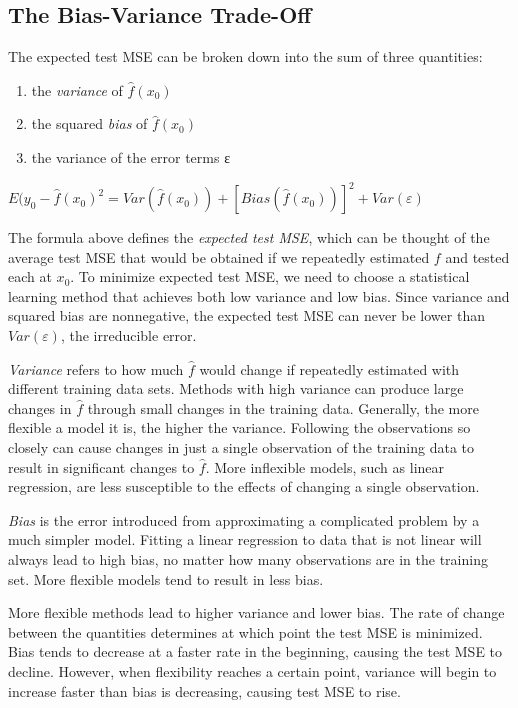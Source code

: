 \documentclass[]{book}
\providecommand{\tightlist}{%
  \setlength{\itemsep}{0pt}\setlength{\parskip}{0pt}}
\begin{document}
\hypertarget{the-bias-variance-trade-off}{%
\subsection{The Bias-Variance Trade-Off}\label{the-bias-variance-trade-off}}

The expected test MSE can be broken down into the sum of three quantities:

\begin{enumerate}
\def\labelenumi{\arabic{enumi}.}
\tightlist
\item
  the \emph{variance} of \(\hat{f}(x_0)\)
\item
  the squared \emph{bias} of \(\hat{f}(x_0)\)
\item
  the variance of the error terms ε
\end{enumerate}

\(E(y_0 - \hat{f}(x_0)^2 = Var(\hat{f}(x_0)) + [Bias(\hat{f}(x_0))]^2+Var(ε)\)

The formula above defines the \emph{expected test MSE}, which can be thought of the average test MSE that would be obtained if we repeatedly estimated \(f\) and tested each at \(x_0\). To minimize expected test MSE, we need to choose a statistical learning method that achieves both low variance and low bias. Since variance and squared bias are nonnegative, the expected test MSE can never be lower than \(Var(ε)\), the irreducible error.

\emph{Variance} refers to how much \(\hat{f}\) would change if repeatedly estimated with different training data sets. Methods with high variance can produce large changes in \(\hat{f}\) through small changes in the training data. Generally, the more flexible a model it is, the higher the variance. Following the observations so closely can cause changes in just a single observation of the training data to result in significant changes to \(\hat{f}\). More inflexible models, such as linear regression, are less susceptible to the effects of changing a single observation.

\emph{Bias} is the error introduced from approximating a complicated problem by a much simpler model. Fitting a linear regression to data that is not linear will always lead to high bias, no matter how many observations are in the training set. More flexible models tend to result in less bias.

More flexible methods lead to higher variance and lower bias. The rate of change between the quantities determines at which point the test MSE is minimized. Bias tends to decrease at a faster rate in the beginning, causing the test MSE to decline. However, when flexibility reaches a certain point, variance will begin to increase faster than bias is decreasing, causing test MSE to rise.
\end{document}
